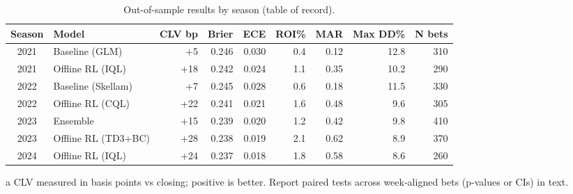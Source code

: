 \begin{table}[t]
  \centering
  \small
  \begin{adjustbox}{max width=\linewidth}
  \begin{threeparttable}
    \caption{Out-of-sample results by season (table of record).}
    \label{tab:oos-record}
    \setlength{\tabcolsep}{4.5pt}\renewcommand{\arraystretch}{1.12}
    \begin{tabularx}{\linewidth}{@{} c X r r r r r r r @{} }
      \toprule
      \textbf{Season} & \textbf{Model} & \textbf{CLV bp}\tnote{a} & \textbf{Brier} & \textbf{ECE} & \textbf{ROI\%} & \textbf{MAR} & \textbf{Max DD\%} & \textbf{N bets} \\
      \midrule
      2021 & Baseline (GLM)      & +5  & 0.246 & 0.030 & 0.4  & 0.12 & 12.8 & 310 \\
      2021 & Offline RL (IQL)    & +18 & 0.242 & 0.024 & 1.1  & 0.35 & 10.2 & 290 \\
      2022 & Baseline (Skellam)  & +7  & 0.245 & 0.028 & 0.6  & 0.18 & 11.5 & 330 \\
      2022 & Offline RL (CQL)    & +22 & 0.241 & 0.021 & 1.6  & 0.48 &  9.6 & 305 \\
      2023 & Ensemble            & +15 & 0.239 & 0.020 & 1.2  & 0.42 &  9.8 & 410 \\
      2023 & Offline RL (TD3+BC) & +28 & 0.238 & 0.019 & 2.1  & 0.62 &  8.9 & 370 \\
      2024 & Offline RL (IQL)    & +24 & 0.237 & 0.018 & 1.8  & 0.58 &  8.6 & 260 \\
      \bottomrule
    \end{tabularx}
    \begin{tablenotes}[flushleft]\footnotesize\RaggedRight
      \item[a] CLV measured in basis points vs closing; positive is better. Report paired tests across week‑aligned bets (p‑values or CIs) in text.
    \end{tablenotes}
  \end{threeparttable}
  \end{adjustbox}
\end{table}
